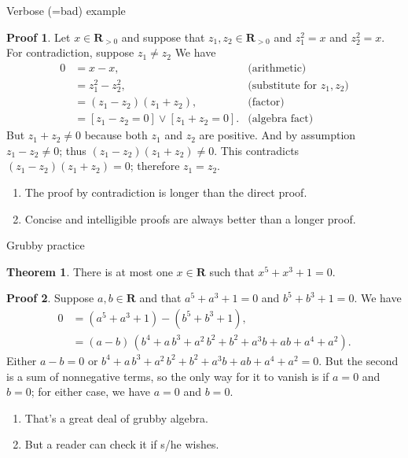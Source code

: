 \documentclass[fleqn]{beamer}
\newcommand{\reals}{\mathbf{R}}
\theoremstyle{definition}
\newtheorem{myth}{Theorem}
\newtheorem{myproof}{Proof}
\newenvironment{checklist}{
  \begin{enumerate}[\checkmark]
    \addtolength{\itemsep}{-1.0\itemsep}}
  {\end{enumerate}}
\begin{document}
\begin{frame}{Verbose (=bad) example}

\begin{myproof}  Let \(x  \in \reals_{> 0} \) and suppose that \(z_1, z_2 \in \reals_{> 0} \) and \(z_1^2 = x\) and \(z_2^2  = x\). For contradiction, suppose \(z_1 \neq z_2\) We have
\begin{align*}
   0 &= x - x,  & \mbox{(arithmetic)} \\
      &= z_1^2 - z_2^2,   &  \mbox{(substitute for }  z_1, z_2)\\
      &= (z_1 - z_2)(z_1+z_2), & \mbox{(factor)} \\
      &=  [z_1 -  z_2= 0]   \lor [z_1 + z_2 = 0].  &  \mbox{(algebra fact)} 
\end{align*}
But \(z_1+z_2 \neq 0\) because both \(z_1\) and \(z_2\) are positive.  And by assumption \(z_1 - z_2 \neq  0\); thus \(  (z_1 - z_2)(z_1+z_2) \neq  0\). This contradicts  \((z_1 - z_2)(z_1+z_2) = 0\); therefore \(z_1 = z_2\).

\end{myproof}

\begin{checklist}
\item The proof by contradiction is longer than the direct proof.

\item Concise and intelligible proofs are always better than a longer proof.

\end{checklist}

\end{frame}

\begin{frame}{Grubby practice}
\begin{myth} There is at most one \(x \in \reals\) such that \(x^5 + x^3 + 1 = 0\). \end{myth}

\begin{myproof}  Suppose   \(a,b \in \reals\) and that  \(a^5 + a^3 + 1= 0\) and \(b^5 + b^3 + 1= 0\). We have
\begin{align*}
   0 &= (a^5 + a^3 + 1) - (b^5 + b^3 + 1), \\
      &= \left( a-b\right) \, \left( {{b}^{4}}+a\, {{b}^{3}}+{{a}^{2}}\, {{b}^{2}}+{{b}^{2}}+{{a}^{3}} b+a b+{{a}^{4}}+{{a}^{2}}\right).
\end{align*}
Either \(a-b = 0\) or \( {{b}^{4}}+a\, {{b}^{3}}+{{a}^{2}}\, {{b}^{2}}+{{b}^{2}}+{{a}^{3}} b+a b+{{a}^{4}}+{{a}^{2}}= 0\). But the second is a sum of nonnegative terms, so the only way for it to vanish is if \(a=0\) and \(b=0\); for either case, we have \(a=0\) and \(b=0\).

\end{myproof} 
\begin{checklist}
\item That's a great deal of grubby algebra.

\item But a reader can check it if s/he wishes.

\end{checklist}

\end{frame}
\end{document}
